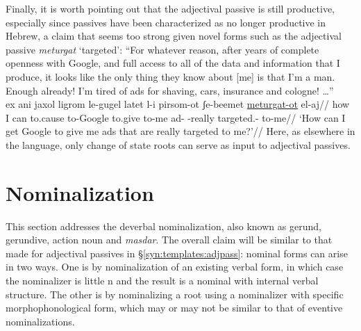Finally, it is worth pointing out that {the adjectival passive} is still productive, especially since passives have been characterized as no longer productive in Hebrew, a claim that seems too strong given novel forms such as{ the adjectival passive} \emph{meturgat} `targeted':
\ex ``For whatever reason, after years of complete openness with Google, and full access to all of the data and information that I produce, it looks like the only thing they know about [me] is that I'm a man. Enough already! I'm tired of ads for shaving, cars, insurance and cologne! \dots ''\\
	\begingl
		\gla ex ani jaxol ligrom le-gugel latet l-i pirsom-ot ʃe-beemet \underline{meturgat-ot} el-aj//
		\glb how I can to.cause to-Google to.give to-me ad- -really targeted.- to-me//
		\glft `How can I get Google to give me ads that are really targeted to me?'//
	\endgl
\xe
Here, as elsewhere in the language, only change of state roots can serve as input to adjectival passives.



\section{Nominalization}


This section addresses the deverbal nominalization, also known as gerund, gerundive, action noun and \emph{masdar}. The overall claim will be similar to that made for adjectival passives in \S\ref{syn:templates:adjpass}: nominal forms can arise in two ways. One is by nominalization of an existing verbal form, in which case the nominalizer is little n and the result is a nominal with internal verbal structure. The other is by nominalizing a root using a nominalizer with specific morphophonological form, which may or may not be similar to that of eventive nominalizations.

